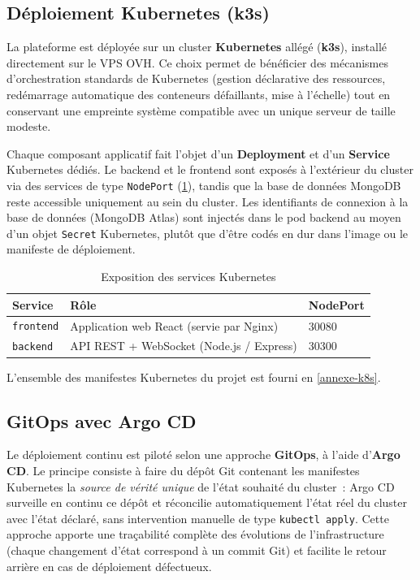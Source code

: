 \subsection{Déploiement Kubernetes (k3s)}

La plateforme est déployée sur un cluster \textbf{Kubernetes} allégé (\textbf{k3s}), installé directement sur le VPS OVH. Ce choix permet de bénéficier des mécanismes d'orchestration standards de Kubernetes (gestion déclarative des ressources, redémarrage automatique des conteneurs défaillants, mise à l'échelle) tout en conservant une empreinte système compatible avec un unique serveur de taille modeste.

Chaque composant applicatif fait l'objet d'un \textbf{Deployment} et d'un \textbf{Service} Kubernetes dédiés. Le backend et le frontend sont exposés à l'extérieur du cluster via des services de type \texttt{NodePort} (\cref{tab-nodeports}), tandis que la base de données MongoDB reste accessible uniquement au sein du cluster. Les identifiants de connexion à la base de données (MongoDB Atlas) sont injectés dans le pod backend au moyen d'un objet \texttt{Secret} Kubernetes, plutôt que d'être codés en dur dans l'image ou le manifeste de déploiement.

\begin{table}[H]
\centering
\caption{Exposition des services Kubernetes}
\label{tab-nodeports}
\begin{tabularx}{\linewidth}{@{}lXl@{}}
\toprule
\textbf{Service} & \textbf{Rôle} & \textbf{NodePort} \\
\midrule
\texttt{frontend} & Application web React (servie par Nginx) & 30080 \\
\texttt{backend} & API REST + WebSocket (Node.js / Express) & 30300 \\
\bottomrule
\end{tabularx}
\end{table}

L'ensemble des manifestes Kubernetes du projet est fourni en \cref{annexe-k8s}.

\subsection{GitOps avec Argo CD}

Le déploiement continu est piloté selon une approche \textbf{GitOps}, à l'aide d'\textbf{Argo CD}. Le principe consiste à faire du dépôt Git contenant les manifestes Kubernetes la \emph{source de vérité unique} de l'état souhaité du cluster~: Argo CD surveille en continu ce dépôt et réconcilie automatiquement l'état réel du cluster avec l'état déclaré, sans intervention manuelle de type \texttt{kubectl apply}. Cette approche apporte une traçabilité complète des évolutions de l'infrastructure (chaque changement d'état correspond à un commit Git) et facilite le retour arrière en cas de déploiement défectueux.

